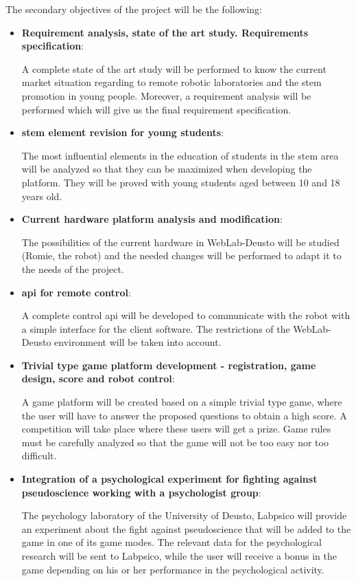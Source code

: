 The secondary objectives of the project will be the following:
\begin{itemize}
\item \textbf{Requirement analysis, state of the art study. Requirements specification}:

A complete state of the art study will be performed to know the current market situation regarding
to remote robotic laboratories and the \acrshort{stem} promotion in young people. Moreover, a
requirement analysis will be performed which will give us the final requirement specification.

\item \textbf{\acrshort{stem} element revision for young students}:

The most influential elements in the education of students in the \acrshort{stem} area will be
analyzed so that they can be maximized when developing the platform. They will be proved with young
students aged between 10 and 18 years old.

\item \textbf{Current hardware platform analysis and modification}:

The possibilities of the current hardware in WebLab-Deusto will be studied (Romie, the robot) and
the needed changes will be performed to adapt it to the needs of the project.

\item \textbf{\acrshort{api} for remote control}:

A complete control \acrshort{api} will be developed to communicate with the robot with a simple
interface for the client software. The restrictions of the WebLab-Deusto environment will be taken
into account.

\item \textbf{Trivial type game platform development - registration, game design, score and robot
control}:

A game platform will be created based on a simple trivial type game, where the user will have to
answer the proposed questions to obtain a high score. A competition will take place where these
users will get a prize. Game rules must be carefully analyzed so that the game will not be too easy
nor too difficult.

\item \textbf{Integration of a psychological experiment for fighting against pseudoscience working
with a psychologist group}:

The psychology laboratory of the University of Deusto, Labpsico will provide an experiment about the
fight against pseudoscience that will be added to the game in one of its game modes. The relevant
data for the psychological research will be sent to Labpsico, while the user will receive a bonus in
the game depending on his or her performance in the psychological activity.


\end{itemize}
